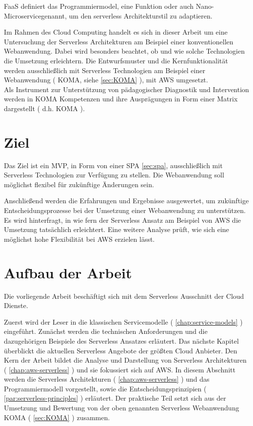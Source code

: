 \documentclass[
12pt,
english,
ngerman,
headsepline,
twoside,
openright,
numbers=noenddot,version=first
]{scrreprt}
\begin{document}
\acrshort{FaaS} definiert das Programmiermodel, eine Funktion oder auch \glqq Nano-Microservice\grqq genannt, um den serverless Architekturstil zu adaptieren.

Im Rahmen des Cloud Computing handelt es sich in dieser Arbeit um eine Untersuchung der Serverless Architekturen am Beispiel einer konventionellen Webanwendung. Dabei wird besonders beachtet, ob und wie solche Technologien die Umsetzung erleichtern. Die Entwurfsmuster und die Kernfunktionalität werden ausschließlich mit Serverless Technologien am Beispiel einer Webanwendung ( \acrfull{KOMA}, siehe \autoref{sec:KOMA} ), mit \acrshort{AWS} umgesetzt.\\
Als Instrument zur Unterstützung von pädagogischer Diagnostik und Intervention werden in \acrshort{KOMA} Kompetenzen und ihre Ausprägungen in Form einer Matrix dargestellt ( d.h. \acrshort{KOMA} ). 


\section{Ziel}
\label{sec:task}
Das Ziel ist ein \acrlong{MVP}, in Form von einer \acrfull{SPA} \autoref{sec:spa}, ausschließlich mit Serverless Technologien zur Verfügung zu stellen.
Die Webanwendung soll möglichst flexibel für zukünftige Änderungen sein.

Anschließend werden die Erfahrungen und Ergebnisse ausgewertet, um zukünftige Entscheidungsprozesse bei der Umsetzung einer Webanwendung zu unterstützen. Es wird hinterfragt, in wie fern der Serverless Ansatz am Beispiel von \acrfull{AWS} die Umsetzung tatsächlich erleichtert. 
Eine weitere Analyse prüft, wie sich eine möglichst hohe Flexibilität bei \acrshort{AWS} erzielen lässt.

\section{Aufbau der Arbeit}
\label{sec:layout}

Die vorliegende Arbeit beschäftigt sich mit dem Serverless Ausschnitt der Cloud Dienste. 

Zuerst wird der Leser in die klassischen Servicemodelle ( \autoref{chap:service-models} ) eingeführt. Zunächst werden die technischen Anforderungen und die dazugehörigen Beispiele des Serverless Ansatzes erläutert.
Das nächste Kapitel überblickt die aktuellen Serverless Angebote der größten Cloud Anbieter.
Den Kern der Arbeit bildet die Analyse und Darstellung von Serverless Architekturen ( \autoref{chap:aws-serverless} ) und sie fokussiert sich auf \acrshort{AWS}. In diesem Abschnitt werden die Serverless Architekturen ( \autoref{chap:aws-serverless} ) und das Programmiermodell vorgestellt, sowie die Entscheidungsprinzipien ( \autoref{par:serverless-principles} ) erläutert.
Der praktische Teil setzt sich aus der Umsetzung und Bewertung von der oben genannten Serverless Webanwendung KOMA ( \autoref{sec:KOMA} ) zusammen.
\end{document}
